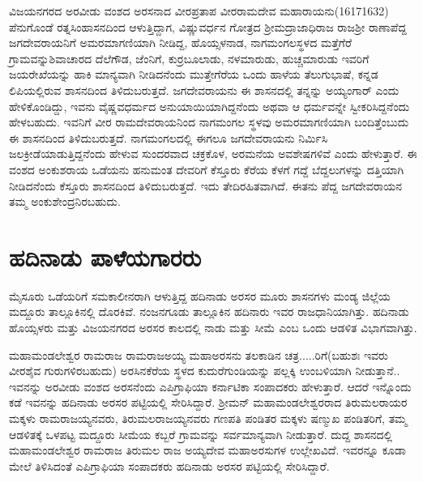ವಿಜಯನಗರದ ಅರವೀಡು ವಂಶದ ಅರಸನಾದ ವೀರಪ್ರತಾಪ ವೀರರಾಮದೇವ ಮಹಾರಾಯನು(1617\enginline{-}1632) ಪೆನುಗೊಂಡೆ ರತ್ನಸಿಂಹಾಸನದಿಂದ ಆಳುತ್ತಿದ್ದಾಗ, ವಿಷ್ಣುವರ್ಧನ ಗೋತ್ರದ ಶ‍್ರೀಮದ್ರಾಜಾಧಿರಾಜ ರಾಜಶ‍್ರೀ ರಾಣಾಪೆದ್ದ ಜಗದೇವರಾಯನಿಗೆ ಅಮರಮಾಗಣಿಯಾಗಿ ನೀಡಿದ್ದ, ಹೊಯ್ಸಳನಾಡ, ನಾಗಮಂಗಲಸ್ಥಳದ ಮತ್ತೆಗೆರೆ ಗ್ರಾಮವನ್ನು\break ಶಿವಾಚಾರದ ದೆಲೆಗೌಡ, ಜೆಂನಿಗೆ, ಕುರ್ರಬೂಲಾಡು, ನಳಮಾರುಡು, ಹುಚ್ಚಮಾರುಡು ಇವರಿಗೆ ಜಯರೇಖೆಯನ್ನು ಹಾಕಿ ಮಾನ್ಯವಾಗಿ ನೀಡಿದನೆಂದು ಮುತ್ತೇಗೆರೆಯ ಒಂದು ಹಾಳೆಯ ತೆಲುಗುಭಾಷೆ, ಕನ್ನಡ ಲಿಪಿಯಲ್ಲಿರುವ ಶಾಸನದಿಂದ ತಿಳಿದುಬರುತ್ತದೆ. ಜಗದೇವರಾಯನು ಈ ಶಾಸನದಲ್ಲಿ ತನ್ನನ್ನು ಅಯ್ಯಂಗಾರ್​ ಎಂದು ಹೇಳಿಕೊಂಡಿದ್ದು, ಇವನು ವೈಷ್ಣವಧರ್ಮದ ಅನುಯಾಯಿ\-ಯಾಗಿದ್ದನೆಂದು ಅಥವಾ ಆ ಧರ್ಮವನ್ನೇ ಸ್ವೀಕರಿಸಿದ್ದನೆಂದು ಹೇಳಬಹುದು. ಇವನಿಗೆ ವೀರ ರಾಮದೇವರಾಯನಿಂದ ನಾಗಮಂಗಲ ಸ್ಥಳವು ಅಮರಮಾಗಣಿಯಾಗಿ ಬಂದಿತ್ತೆಂಬುದು ಈ ಶಾಸನದಿಂದ ತಿಳಿದುಬರುತ್ತದೆ. ನಾಗಮಂಗಲದಲ್ಲಿ ಈಗಲೂ ಜಗದೇವರಾಯನು ನಿರ್ಮಿಸಿ ಜಲಕ್ರೀಡೆಯಾಡುತ್ತಿದ್ದನೆಂದು ಹೇಳುವ ಸುಂದರವಾದ ಚಕ್ರಕೊಳ, ಅರಮನೆಯ ಅವಶೇಷಗಳಿವೆ ಎಂದು ಹೇಳುತ್ತಾರೆ. ಈ ವಂಶದ ಅಂಕುಶರಾಯ ಒಡೆಯನು ಹನುಮಂತ ದೇವರಿಗೆ ಕೆಸ್ತೂರು ಕೆರೆಯ ಕೆಳಗೆ ಗದ್ದೆ ಬೆದ್ದಲುಗಳನ್ನು ದತ್ತಿಯಾಗಿ ನೀಡಿದನೆಂದು ಕೆಸ್ತೂರು ಶಾಸನದಿಂದ ತಿಳಿದುಬರುತ್ತದೆ. ಇದು ತೇದಿರಹಿತವಾಗಿದೆ. ಈತನು ಪೆದ್ದ ಜಗದೇವರಾಯನ ತಮ್ಮ ಅಂಕುಶೇಂದ್ರನಿರಬಹುದು.


\section{ಹದಿನಾಡು ಪಾಳೆಯಗಾರರು}

ಮೈಸೂರು ಒಡೆಯರಿಗೆ ಸಮಕಾಲೀನರಾಗಿ ಆಳುತ್ತಿದ್ದ ಹದಿನಾಡು ಅರಸರ ಮೂರು ಶಾಸನಗಳು ಮಂಡ್ಯ ಜಿಲ್ಲೆಯ ಮದ್ದೂರು ತಾಲ್ಲೂಕಿನಲ್ಲಿ ದೊರಕಿವೆ. ನಂಜನಗೂಡು ತಾಲ್ಲೂಕಿನ ಹದಿನಾರು ಇವರ ರಾಜಧಾನಿಯಾಗಿತ್ತು. ಹದಿನಾಡು ಹೊಯ್ಸಳರು ಮತ್ತು ವಿಜಯನಗರದ ಅರಸರ ಕಾಲದಲ್ಲಿ ನಾಡು ಮತ್ತು ಸೀಮೆ ಎಂಬ ಒಂದು ಆಡಳಿತ ವಿಭಾಗವಾಗಿತ್ತು.

ಮಹಾಮಂಡಲೇಶ್ವರ ರಾಮರಾಜ ರಾಮರಾಜಅಯ್ಯ ಮಹಾಅರಸನು ತಲಕಾಡಿನ ಚತ್ರ.....ರಿಗೆ(ಬಹುಶಃ ಇವರು ವೀರಶೈವ ಗುರುಗಳಿರಬಹುದು) ಅರಸಿನಕೆರೆಯ ಸ್ಥಳದ ಕುದುರೆಗುಂಡಿಯನ್ನು ಪಲ್ಲಕ್ಕಿ ಉಂಬಳಿಯಾಗಿ ನೀಡುತ್ತಾನೆ.. ಇವನನ್ನು ಅರವೀಡು ವಂಶದ ಅರಸನೆಂದು ಎಪಿಗ್ರಾಫಿಯಾ ಕರ್ನಾಟಿಕಾ ಸಂಪಾದಕರು ಹೇಳುತ್ತಾರೆ. ಆದರೆ ಇನ್ನೊಂದು ಕಡೆ ಇವನನ್ನು ಹದಿನಾಡು ಅರಸರ ಪಟ್ಟಿಯಲ್ಲಿ ಸೇರಿಸಿದ್ದಾರೆ. ಶ‍್ರೀಮನ್​ ಮಹಾಮಂಡಲೇಶ್ವರರಾದ ತಿರುಮಲರಾಯರ ಮಕ್ಕಳು ರಾಮರಾಜಯ್ಯನವರು, ತಿರುಮಲರಾಜಯ್ಯನವರು ಗಣಪತಿ ಪಂಡಿತರ ಮಕ್ಕಳು ಷಣ್ಮುಖ ಪಂಡಿತರಿಗೆ, ತಮ್ಮ ಆಡಳಿತಕ್ಕೆ ಒಳಪಟ್ಟ ಮದ್ದೂರು ಸೀಮೆಯ ಕಬ್ಬರೆ ಗ್ರಾಮವನ್ನು ಸರ್ವಮಾನ್ಯವಾಗಿ ನೀಡುತ್ತಾರೆ. ದುದ್ದ ಶಾಸನದಲ್ಲಿ ಮಹಾಮಂಡಲೇಶ್ವರ ರಾಮರಾಜ ತಿರುಮಲ ರಾಜ ಅಯ್ಯದೇವ ಮಹಾಅರಸುಗಳ ಉಲ್ಲೇಖವಿದೆ. ಇವರನ್ನೂ ಕೂಡಾ ಮೇಲೆ ತಿಳಿಸಿದಂತೆ ಎಪಿಗ್ರಾಫಿಯಾ ಸಂಪಾದಕರು ಹದಿನಾಡು ಅರಸರ ಪಟ್ಟಿಯಲ್ಲಿ ಸೇರಿಸಿದ್ದಾರೆ.

